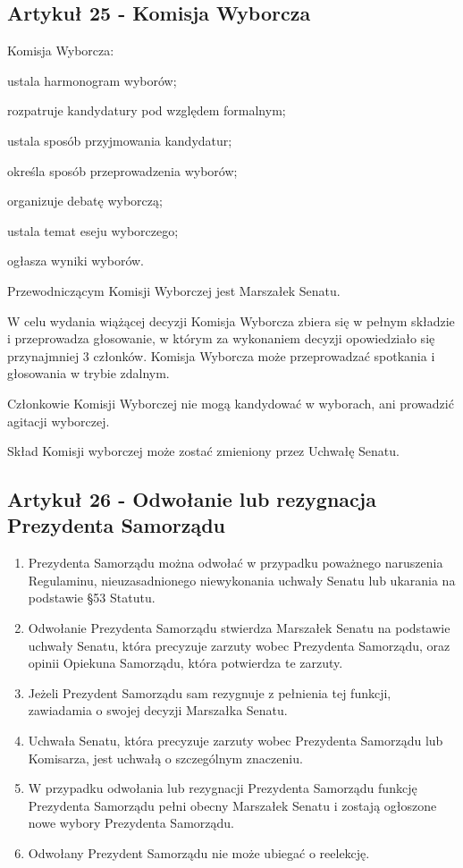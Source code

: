 \documentclass[14pt]{article}
\newcounter{podpunktyCounter}
\newenvironment{podpunkty}
{%
	\begin{list}{\arabic{podpunktyCounter})}%
		{%
			\usecounter{podpunktyCounter}
			\setlength{\itemsep}{1pt}
			\setlength{\topsep}{3pt}
		}%
	}%
	{\end{list}}
\newenvironment{ustepy}{%
	\begin{enumerate}[leftmargin=1.5em, itemindent=1pt, labelwidth=1em, itemsep=5pt]
	}{%
	\end{enumerate}
}
\begin{document}
\subsection*{Artykuł 25 - Komisja Wyborcza}
\begin{ustepy}
	\item Komisja Wyborcza:
	\begin{podpunkty}
		\item ustala harmonogram wyborów;
		\item rozpatruje kandydatury pod względem formalnym;
		\item ustala sposób przyjmowania kandydatur;
		\item określa sposób przeprowadzenia wyborów;
		\item organizuje debatę wyborczą;
		\item ustala temat eseju wyborczego;
		\item ogłasza wyniki wyborów.
	\end{podpunkty}
	\item Przewodniczącym Komisji Wyborczej jest Marszałek Senatu.
	\item W celu wydania wiążącej decyzji Komisja Wyborcza zbiera się w pełnym składzie i przeprowadza głosowanie, w którym za wykonaniem decyzji opowiedziało się przynajmniej 3 członków. Komisja Wyborcza może przeprowadzać spotkania i głosowania w trybie zdalnym.
	\item Członkowie Komisji Wyborczej nie mogą kandydować w wyborach, ani prowadzić agitacji wyborczej.
	\item Skład Komisji wyborczej może zostać zmieniony przez Uchwałę Senatu.
	\end{ustepy}
\subsection*{Artykuł 26 - Odwołanie lub rezygnacja Prezydenta Samorządu}
\begin{ustepy}
	\item Prezydenta Samorządu można odwołać w przypadku poważnego naruszenia Regulaminu, nieuzasadnionego niewykonania uchwały Senatu lub ukarania na podstawie §53 Statutu.
	\item Odwołanie Prezydenta Samorządu stwierdza Marszałek Senatu na podstawie uchwały Senatu, która precyzuje zarzuty wobec Prezydenta Samorządu, oraz opinii Opiekuna Samorządu, która potwierdza te zarzuty.
	\item Jeżeli Prezydent Samorządu sam rezygnuje z pełnienia tej funkcji, zawiadamia o swojej decyzji Marszałka Senatu.
	\item Uchwała Senatu, która precyzuje zarzuty wobec Prezydenta Samorządu lub Komisarza, jest uchwałą o szczególnym znaczeniu.
	\item W przypadku odwołania lub rezygnacji Prezydenta Samorządu funkcję Prezydenta Samorządu pełni obecny Marszałek Senatu i zostają ogłoszone nowe wybory Prezydenta Samorządu.
	\item Odwołany Prezydent Samorządu nie może ubiegać o reelekcję.
\end{ustepy}
\end{document}
